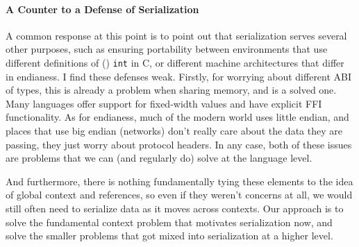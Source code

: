 \paragraph{A Counter to a Defense of Serialization}

A common response at this point is to point out that serialization serves several other purposes, such as ensuring
portability between environments that use different definitions of (\eg) \texttt{int} in C, or different machine
architectures that differ in endianess. I find these defenses weak. Firstly, for worrying about different ABI of types,
this is already a problem when sharing memory, and is a solved one. Many languages offer support for fixed-width values
and have explicit FFI functionality. As for endianess, much of the modern world uses little endian, and places that use big endian (networks) don't
really care about the data they are passing, they just worry about protocol headers. In any case, both of these issues
are problems that we can (and regularly do) solve at the language level.

And furthermore, there is nothing fundamentally tying these elements to the idea of global context and references, so
even if they weren't concerns at all, we would still often need to serialize data as it moves across contexts. Our approach
is to solve the fundamental context problem that motivates serialization now, and solve the smaller problems that got
mixed into serialization at a higher level.

